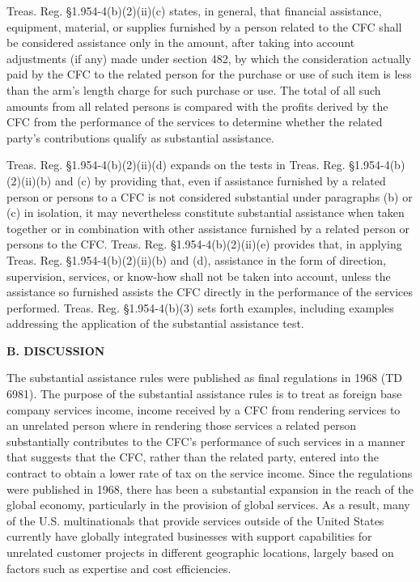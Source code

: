 \begin{select}
Treas. Reg. \S 1.954-4(b)(2)(ii)(c) states, in general, that financial assistance, equipment, material, or supplies furnished by a person related to the CFC shall be considered assistance only in the amount, after taking into account adjustments (if any) made under section 482, by which the consideration actually paid by the CFC to the related person for the purchase or use of such item is less than the arm's length charge for such purchase or use. The total of all such amounts from all related persons is compared with the profits derived by the CFC from the performance of the services to determine whether the related party's contributions qualify as substantial assistance.

Treas. Reg. \S 1.954-4(b)(2)(ii)(d) expands on the tests in Treas. Reg. \S 1.954-4(b)(2)(ii)(b) and (c) by providing that, even if assistance furnished by a related person or persons to a CFC is not considered substantial under paragraphs (b) or (c) in isolation, it may nevertheless constitute substantial assistance when taken together or in combination with other assistance furnished by a related person or persons to the CFC. Treas. Reg. \S 1.954-4(b)(2)(ii)(e) provides that, in applying Treas. Reg. \S 1.954-4(b)(2)(ii)(b) and (d), assistance in the form of direction, supervision, services, or know-how shall not be taken into account, unless the assistance so furnished assists the CFC directly in the performance of the services performed. Treas. Reg. \S 1.954-4(b)(3) sets forth examples, including examples addressing the application of the substantial assistance test.

\begin{center}
\textbf{B. DISCUSSION}
\end{center}

The substantial assistance rules were published as final regulations in 1968 (TD 6981). The purpose of the substantial assistance rules is to treat as foreign base company services income, income received by a CFC from rendering services to an unrelated person where in rendering those services a related person substantially contributes to the CFC's performance of such services in a manner that suggests that the CFC, rather than the related party, entered into the contract to obtain a lower rate of tax on the service income. Since the regulations were published in 1968, there has been a substantial expansion in the reach of the global economy, particularly in the provision of global services. As a result, many of the U.S. multinationals that provide services outside of the United States currently have globally integrated businesses with support capabilities for unrelated customer projects in different geographic locations, largely based on factors such as expertise and cost efficiencies.


\end{select}
